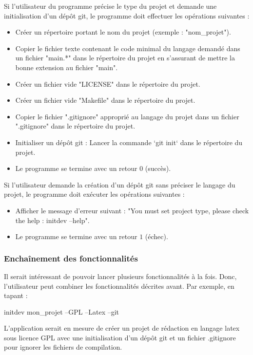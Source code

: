 \documentclass[10pt,a4paper]{article}
\begin{document}
Si l'utilisateur du programme précise le type du projet et demande une initialisation d'un dépôt git, le programme doit effectuer les opérations suivantes :
  \begin{itemize}
    \item Créer un répertoire portant le nom du projet (exemple : "nom\_projet").
    \item Copier le fichier texte contenant le code minimal du langage demandé dans un fichier "main.*" dans le  répertoire du projet en s'assurant de mettre la bonne extension au fichier "main".
    \item Créer un fichier vide "LICENSE" dans le répertoire du projet.
    \item Créer un fichier vide "Makefile" dans le  répertoire du projet.
    \item Copier le fichier ".gitignore" approprié au langage du projet dans un fichier ".gitignore" dans le  répertoire du projet.
    \item Initialiser un dépôt git : Lancer la commande `git init` dans le répertoire du projet.
    \item Le programme se termine avec un retour $0$ (succès).
  \end{itemize}

  Si l'utilisateur demande la création d'un dépôt git sans préciser le langage du projet, le programme doit exécuter les opérations suivantes :
  \begin{itemize}
    \item  Afficher le message d'erreur suivant : "You must set project type, please check the help : initdev --help".
    \item Le programme se termine avec un retour $1$ (échec). 
\end{itemize}

\subsubsection{Enchaînement des fonctionnalités}
  Il serait intéressant de pouvoir lancer plusieurs fonctionnalités à la fois. Donc, l'utilisateur peut combiner les fonctionnalités décrites avant. Par exemple, en tapant :
  \begin{center}
    initdev mon\_projet --GPL --Latex --git
  \end{center}
  L'application serait en mesure de créer un projet de rédaction en langage latex sous licence GPL avec une initialisation d'un dépôt git et un fichier .gitignore pour ignorer les fichiers de compilation.
\end{document}
